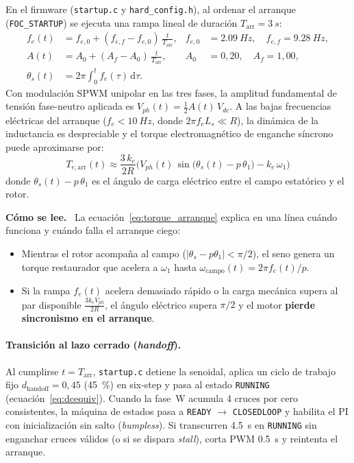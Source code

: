 \documentclass[11pt,a4paper,oneside]{report}
\theoremstyle{definition}
\theoremstyle{remark}
\newenvironment{lectura}%
  {\par\smallskip\noindent\textbf{Cómo se lee.}\ }%
  {\par\smallskip}
\newcommand{\dd}{\mathrm{d}}
\begin{document}
En el firmware (\texttt{startup.c} y \texttt{hard\_config.h}), al ordenar el
arranque (\texttt{FOC\_STARTUP}) se ejecuta una rampa lineal de duración
$T_{\text{arr}}=\SI{3}{s}$:
\begin{align}
  f_e(t) &= f_{e,0} + (f_{e,f}-f_{e,0})\,\frac{t}{T_{\text{arr}}}, &
  f_{e,0}&=\SI{2,09}{Hz},\quad f_{e,f}=\SI{9,28}{Hz}, \label{eq:rampa_f}\\
  A(t) &= A_0 + (A_f-A_0)\,\frac{t}{T_{\text{arr}}}, &
  A_0&=0{,}20,\quad A_f=1{,}00, \label{eq:rampa_a}\\
  \theta_s(t) &= 2\pi\int_0^t f_e(\tau)\,\dd\tau.
\end{align}
Con modulación SPWM unipolar en las tres fases, la amplitud fundamental de
tensión fase-neutro aplicada es $V_{ph}(t) = \tfrac{1}{2}A(t)\,V_{dc}$. A las
bajas frecuencias eléctricas del arranque ($f_e < \SI{10}{Hz}$, donde
$2\pi f_e L_s \ll R$), la dinámica de la inductancia es despreciable y el torque
electromagnético de enganche síncrono puede aproximarse por:
\begin{equation}
  \boxed{\;T_{e,\text{arr}}(t) \approx \frac{3\,k_e}{2R}
  \Big(V_{ph}(t)\,\sin\!\big(\theta_s(t)-p\,\theta_1\big) - k_e\,\omega_1\Big)\;}
  \label{eq:torque_arranque}
\end{equation}
donde $\theta_s(t)-p\,\theta_1$ es el ángulo de carga eléctrico entre el campo
estatórico y el rotor.

\begin{lectura}
La ecuación~\eqref{eq:torque_arranque} explica en una línea cuándo funciona y
cuándo falla el arranque ciego:
\begin{itemize}
  \item Mientras el rotor acompaña al campo ($|\theta_s - p\theta_1|<\pi/2$), el
        seno genera un torque restaurador que acelera a $\omega_1$ hasta
        $\omega_{\text{campo}}(t)=2\pi f_e(t)/p$.
  \item Si la rampa $f_e(t)$ acelera demasiado rápido o la carga mecánica
        supera al par disponible $\frac{3k_e V_{ph}}{2R}$, el ángulo eléctrico
        supera $\pi/2$ y el motor \textbf{pierde sincronismo en el arranque}.
\end{itemize}
\end{lectura}

\paragraph{Transición al lazo cerrado (\emph{handoff}).} Al cumplirse
$t = T_{\text{arr}}$, \texttt{startup.c} detiene la senoidal, aplica un ciclo
de trabajo fijo $d_{\text{handoff}} = 0{,}45$ (\SI{45}{\percent}) en six-step y
pasa al estado \texttt{RUNNING} (ecuación~\eqref{eq:dcequiv}). Cuando la fase~W
acumula 4 cruces por cero consistentes, la máquina de estados pasa a
\texttt{READY} $\to$ \texttt{CLOSEDLOOP} y habilita el PI con inicialización sin
salto (\emph{bumpless}). Si transcurren \SI{4,5}{s} en \texttt{RUNNING} sin
enganchar cruces válidos (o si se dispara \emph{stall}), corta PWM \SI{0,5}{s}
y reintenta el arranque.
\end{document}

